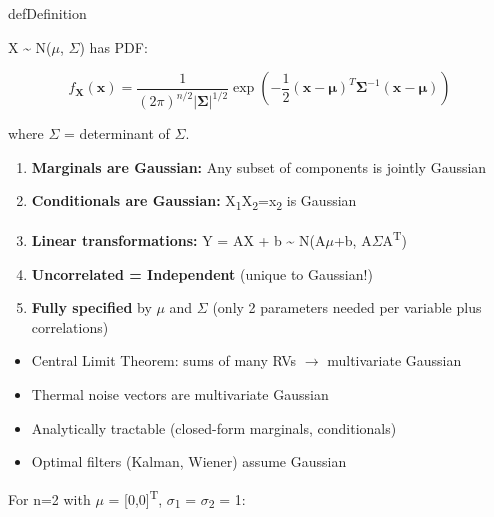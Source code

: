 
\begin{PSbox}[unbreakable]{def}{Definition}

X \textasciitilde{} N(\ensuremath{\mu}, \ensuremath{\Sigma}) has PDF:

\[f_\mathbf{X}(\mathbf{x}) = \frac{1}{(2\pi)^{n/2}|\boldsymbol{\Sigma}|^{1/2}} \exp\left(-\frac{1}{2}(\mathbf{x}-\boldsymbol{\mu})^T \boldsymbol{\Sigma}^{-1}(\mathbf{x}-\boldsymbol{\mu})\right)\]

where \textbar{}\ensuremath{\Sigma}\textbar{} = determinant of \ensuremath{\Sigma}.

\end{PSbox}


\begin{enumerate}
\def\labelenumi{\arabic{enumi}.}
\tightlist
\item
  \textbf{Marginals are Gaussian:} Any subset of components is jointly Gaussian
\item
  \textbf{Conditionals are Gaussian:} X\textsubscript{1}\textbar{}X\textsubscript{2}=x\textsubscript{2} is Gaussian
\item
  \textbf{Linear transformations:} Y = AX + b \textasciitilde{} N(A\ensuremath{\mu}+b, A\ensuremath{\Sigma}A\textsuperscript{T})
\item
  \textbf{Uncorrelated = Independent} (unique to Gaussian!)
\item
  \textbf{Fully specified} by \ensuremath{\mu} and \ensuremath{\Sigma} (only 2 parameters needed per variable plus correlations)
\end{enumerate}


\begin{itemize}
\tightlist
\item
  Central Limit Theorem: sums of many RVs \ensuremath{\to} multivariate Gaussian
\item
  Thermal noise vectors are multivariate Gaussian
\item
  Analytically tractable (closed-form marginals, conditionals)
\item
  Optimal filters (Kalman, Wiener) assume Gaussian
\end{itemize}


For n=2 with \ensuremath{\mu} = [0,0]\textsuperscript{T}, \ensuremath{\sigma}\textsubscript{1} = \ensuremath{\sigma}\textsubscript{2} = 1:

